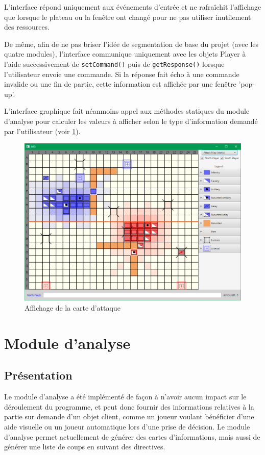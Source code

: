 \documentclass[a4paper]{report}
\begin{document}
L'interface répond uniquement aux événements d'entrée et ne rafraîchit l'affichage que lorsque le plateau ou la fenêtre ont changé pour ne pas utiliser inutilement des ressources.

De même, afin de ne pas briser l'idée de segmentation de base du projet (avec les quatre modules), l'interface communique uniquement avec les objets Player à l'aide successivement de {\tt setCommand()} puis de {\tt getResponse()} lorsque l'utilisateur envoie une commande. Si la réponse fait écho à une commande invalide ou une fin de partie, cette information est affichée par une fenêtre 'pop-up'.

L'interface graphique fait néanmoins appel aux méthodes statiques du module d'analyse pour calculer les valeurs à afficher selon le type d'information demandé par l'utilisateur (voir \ref{fig:ui_full_attack}).

\begin{figure}[h]
\centering
\includegraphics[width=1.0\textwidth]{interface/ui_full_attack}
\caption{Affichage de la carte d'attaque}\label{fig:ui_full_attack}
\end{figure}

\section{Module d'analyse}
\label{sec:analyse}
\subsection{Présentation}
Le module d'analyse a été implémenté de façon à n'avoir aucun impact sur le déroulement du programme, et peut donc fournir des informations relatives à la partie sur demande d'un objet client, comme un joueur voulant bénéficier d'une aide visuelle ou un joueur automatique lors d'une prise de décision. Le module d'analyse permet actuellement de générer des cartes d'informations, mais aussi de générer une liste de coups en suivant des directives.
\end{document}
